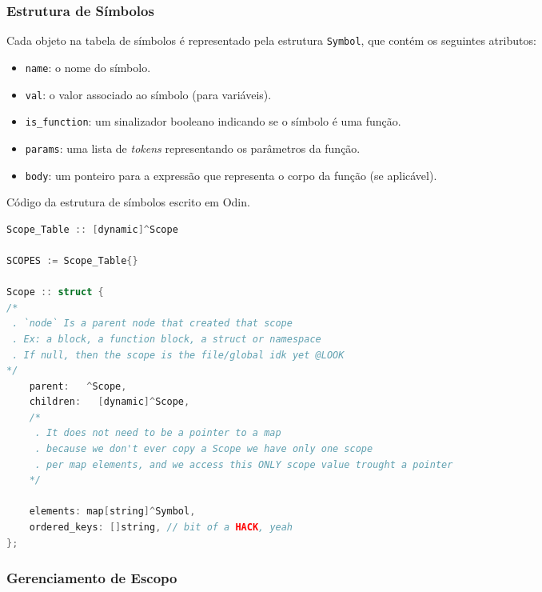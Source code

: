 \subsubsection{Estrutura de Símbolos}


Cada objeto na tabela de símbolos é representado pela estrutura \texttt{Symbol}, que contém os seguintes atributos:
\begin{itemize}
    \item \texttt{name}: o nome do símbolo.
    \item \texttt{val}: o valor associado ao símbolo (para variáveis).
    \item \texttt{is\_function}: um sinalizador booleano indicando se o símbolo é uma função.
    \item \texttt{params}: uma lista de \textit{tokens} representando os parâmetros da função.
    \item \texttt{body}: um ponteiro para a expressão que representa o corpo da função (se aplicável).
\end{itemize}




\begin{codigo}[htb]
\caption{\small Código da estrutura de símbolos escrito em Odin.}
\label{struct-symbol}
\begin{lstlisting}[language=C]
Scope_Table :: [dynamic]^Scope

SCOPES := Scope_Table{}

Scope :: struct {
/*
 . `node` Is a parent node that created that scope
 . Ex: a block, a function block, a struct or namespace
 . If null, then the scope is the file/global idk yet @LOOK
*/
    parent:   ^Scope,
    children:   [dynamic]^Scope,
    /*
     . It does not need to be a pointer to a map
     . because we don't ever copy a Scope we have only one scope
     . per map elements, and we access this ONLY scope value trought a pointer
    */

    elements: map[string]^Symbol,
    ordered_keys: []string, // bit of a HACK, yeah
};

\end{lstlisting}
\end{codigo}


\subsubsection{Gerenciamento de Escopo}

